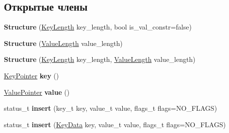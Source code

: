 \subsection*{Открытые члены}
\begin{DoxyCompactItemize}
\item 
\mbox{\label{class_s_p_u_1_1_structure_a1ba8a2044329b292bca47657c780814e}} 
{\bfseries Structure} (\hyperlink{class_s_p_u_1_1_fields_length}{Key\+Length} key\+\_\+length, bool is\+\_\+val\+\_\+constr=false)
\item 
\mbox{\label{class_s_p_u_1_1_structure_a8f1fa54defe46c0e00e5a6238c787a67}} 
{\bfseries Structure} (\hyperlink{class_s_p_u_1_1_fields_length}{Value\+Length} value\+\_\+length)
\item 
\mbox{\label{class_s_p_u_1_1_structure_a3de5498cf78a12a4035f95650bc79b81}} 
{\bfseries Structure} (\hyperlink{class_s_p_u_1_1_fields_length}{Key\+Length} key\+\_\+length, \hyperlink{class_s_p_u_1_1_fields_length}{Value\+Length} value\+\_\+length)
\item 
\mbox{\label{class_s_p_u_1_1_structure_a1f8300c2f83593861eb28cca1f325566}} 
\hyperlink{class_s_p_u_1_1_fields_pointer}{Key\+Pointer} {\bfseries key} ()
\item 
\mbox{\label{class_s_p_u_1_1_structure_a01afbdf0a4361daeccf06d8e9f705b44}} 
\hyperlink{class_s_p_u_1_1_fields_pointer}{Value\+Pointer} {\bfseries value} ()
\item 
\mbox{\label{class_s_p_u_1_1_structure_aacf3f53ac5881d1501fd463177e8d134}} 
status\+\_\+t {\bfseries insert} (key\+\_\+t key, value\+\_\+t value, flags\+\_\+t flags=N\+O\+\_\+\+F\+L\+A\+GS)
\item 
\mbox{\label{class_s_p_u_1_1_structure_a014733e99be0d1f989c905355e4e17e0}} 
status\+\_\+t {\bfseries insert} (\hyperlink{class_s_p_u_1_1_fields_data}{Key\+Data} key, value\+\_\+t value, flags\+\_\+t flags=N\+O\+\_\+\+F\+L\+A\+GS)
\item 
\mbox{\label{class_s_p_u_1_1_structure_aa99577c268a263c434ba960dfea39b72}} 

\end{DoxyCompactItemize}
